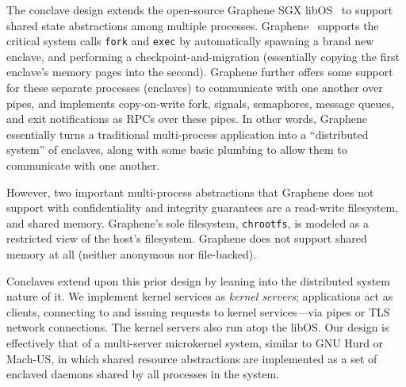 The conclave design extends the open-source Graphene SGX libOS~\cite{graphene}
to support shared state abstractions among multiple processes.
%
Graphene~\cite{graphene} supports the critical system calls
\texttt{fork} and \texttt{exec} by automatically spawning a brand new
enclave, and performing a checkpoint-and-migration (essentially copying
the first enclave's memory pages into the second).
%
Graphene further offers some support for these separate processes
(enclaves) to communicate with one another over pipes, and implements
copy-on-write fork, signals, semaphores, message queues, and exit
notifications as RPCs over these pipes.
%
In other words, Graphene essentially turns a traditional multi-process
application into a ``distributed system'' of enclaves, along with some
basic plumbing to allow them to communicate with one another.



However, two important multi-process abstractions that Graphene does not support with
confidentiality and integrity guarantees are a read-write filesystem, and
shared memory.
%
Graphene's sole filesystem, \texttt{chrootfs}, is modeled as a restricted view
of the host's filesystem.
%
%
Graphene does not support shared memory at all (neither anonymous nor
file-backed).


Conclaves extend upon this prior design by leaning into the distributed
system nature of it.
%
We implement kernel services as \emph{kernel servers}; applications
act as clients, connecting to and issuing requests to kernel
services---via pipes or TLS network connections.
%
The kernel servers also run atop the libOS.
%
Our design is effectively that of a multi-server microkernel system,
similar to GNU Hurd or Mach-US, in which shared resource abstractions
are implemented as a set of enclaved daemons shared by all processes in
the system.


